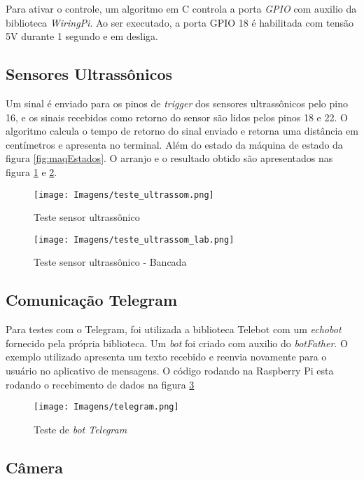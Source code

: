 \documentclass[conference]{IEEEtran}
\begin{document}
\begin{itemize}
Para ativar o controle, um algoritmo em C controla a porta \textit{GPIO} com auxilio da biblioteca \textit{WiringPi}. Ao ser executado, a porta GPIO 18 é habilitada com tensão 5V durante 1 segundo e em desliga. 

\subsection{Sensores Ultrassônicos}

Um sinal é enviado para os pinos de \textit{trigger} dos sensores ultrassônicos pelo pino 16, e os sinais recebidos como retorno do sensor são lidos pelos pinos 18 e 22. O algoritmo calcula o tempo de retorno do sinal enviado e retorna uma distância em centímetros e apresenta no terminal. Além do estado da máquina de estado da figura \ref{fig:maqEstados}. O arranjo e o resultado obtido são apresentados nas figura \ref{fig:teste_us1} e \ref{fig:teste_us2}.

\begin{figure}[h]
    \centering
    \texttt{[image: Imagens/teste\_ultrassom.png]}
    \caption{Teste sensor ultrassônico}
    \label{fig:teste_us1}
\end{figure}

\begin{figure}[h]
    \centering
    \texttt{[image: Imagens/teste\_ultrassom\_lab.png]}
    \caption{Teste sensor ultrassônico - Bancada}
    \label{fig:teste_us2}
\end{figure}


\subsection{Comunicação Telegram}

Para testes com o Telegram, foi utilizada a biblioteca Telebot com um \textit{echobot} fornecido pela própria biblioteca. Um \textit{bot} foi criado com auxilio do \textit{botFather}. O exemplo utilizado apresenta um texto recebido e reenvia novamente para o usuário no aplicativo de mensagens. O código rodando na Raspberry Pi esta rodando o recebimento de dados na figura \ref{fig:telegram_test}

\begin{figure}[h]
    \centering
    \texttt{[image: Imagens/telegram.png]}
    \caption{Teste de \textit{bot Telegram}}
    \label{fig:telegram_test}
\end{figure}

\subsection{Câmera}


\end{itemize}
\end{document}
